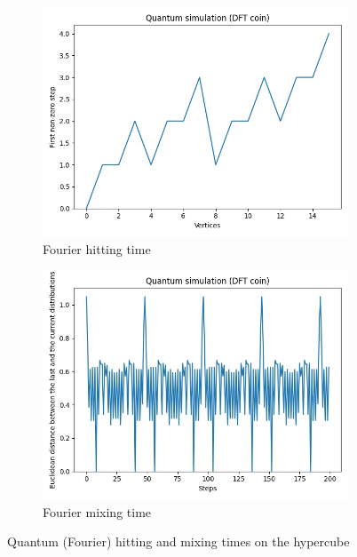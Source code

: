\begin{figure}[H]
  \centering
  \begin{subfigure}{.45\linewidth}
    \centering
    \includegraphics[width=\linewidth]{./figures/results/hypercube/dft_hitting_time.jpg}
    \caption{Fourier hitting time}
  \end{subfigure}
  \begin{subfigure}{.45\linewidth}
    \centering
    \includegraphics[width=\linewidth]{./figures/results/hypercube/dft_mixing_time.jpg}
    \caption{Fourier mixing time}
  \end{subfigure}
  \caption{Quantum (Fourier) hitting and mixing times on the hypercube}
\end{figure}
